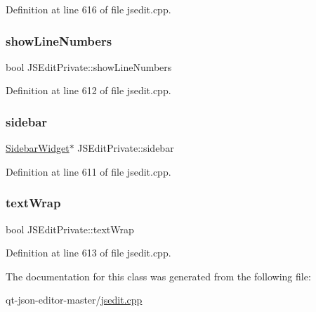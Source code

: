 Definition at line 616 of file jsedit.\+cpp.

\mbox{\label{class_j_s_edit_private_aa41ada65e23a14ca6e3cfd185319d31b}} 
\subsubsection{\texorpdfstring{show\+Line\+Numbers}{showLineNumbers}}
{\footnotesize\ttfamily bool J\+S\+Edit\+Private\+::show\+Line\+Numbers}



Definition at line 612 of file jsedit.\+cpp.

\mbox{\label{class_j_s_edit_private_a44ba07d9a266dc8564bd1c9c49a6b49d}} 
\subsubsection{\texorpdfstring{sidebar}{sidebar}}
{\footnotesize\ttfamily \hyperlink{class_sidebar_widget}{Sidebar\+Widget}$\ast$ J\+S\+Edit\+Private\+::sidebar}



Definition at line 611 of file jsedit.\+cpp.

\mbox{\label{class_j_s_edit_private_a19bda76829866effa8e7a3584c17046d}} 
\subsubsection{\texorpdfstring{text\+Wrap}{textWrap}}
{\footnotesize\ttfamily bool J\+S\+Edit\+Private\+::text\+Wrap}



Definition at line 613 of file jsedit.\+cpp.



The documentation for this class was generated from the following file\+:\begin{DoxyCompactItemize}
\item 
qt-\/json-\/editor-\/master/\hyperlink{jsedit_8cpp}{jsedit.\+cpp}\end{DoxyCompactItemize}
